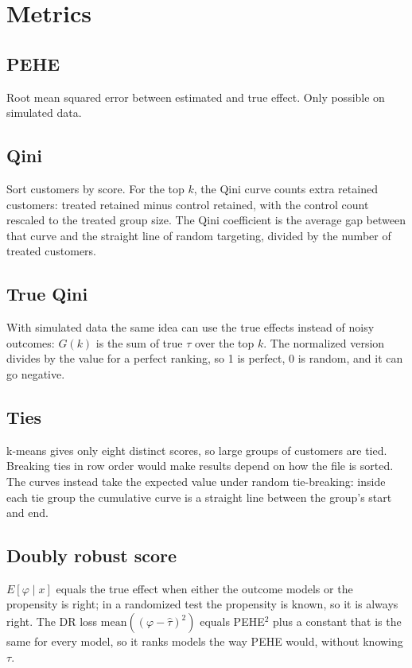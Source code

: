 \documentclass[11pt]{article}
\begin{document}

\section{Metrics}
\label{sec:metrics}

\subsection{PEHE}
Root mean squared error between estimated and true effect. Only possible on simulated data.

\subsection{Qini}
Sort customers by score. For the top $k$, the Qini curve counts extra retained customers: treated retained minus control retained, with the control count rescaled to the treated group size.
The Qini coefficient is the average gap between that curve and the straight line of random targeting, divided by the number of treated customers.

\subsection{True Qini}
With simulated data the same idea can use the true effects instead of noisy outcomes: $G(k)$ is the sum of true $\tau$ over the top $k$. The normalized version divides by the value for a perfect ranking, so 1 is perfect, 0 is random, and it can go negative.

\subsection{Ties}
k-means gives only eight distinct scores, so large groups of customers are tied. Breaking ties in row order would make results depend on how the file is sorted. The curves instead take the expected value under random tie-breaking: inside each tie group the cumulative curve is a straight line between the group's start and end.

\subsection{Doubly robust score}
$E[\varphi \mid x]$ equals the true effect when either the outcome models or the propensity is right; in a randomized test the propensity is known, so it is always right. The DR loss $\text{mean}((\varphi - \hat\tau)^2)$ equals PEHE$^2$ plus a constant that is the same for every model, so it ranks models the way PEHE would, without knowing $\tau$.
\end{document}
